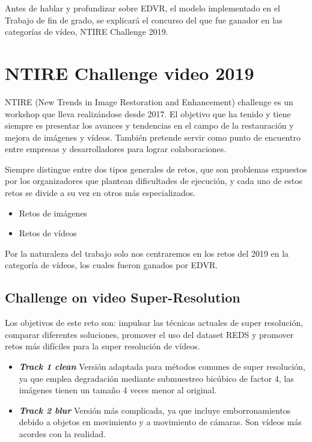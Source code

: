 
    Antes de hablar y profundizar sobre EDVR, el modelo implementado en el Trabajo de fin de grado, se explicará el concurso del que fue ganador en las categorías de vídeo, NTIRE Challenge 2019.
    
    \section{NTIRE Challenge video 2019}

   NTIRE (New Trends in Image Restoration and Enhancement) challenge es un workshop que lleva realizándose desde 2017. El objetivo que ha tenido y tiene siempre es presentar los avances y tendencias en el campo de la restauración y mejora de imágenes y vídeos. También pretende servir como punto de encuentro entre empresas y desarrolladores para lograr colaboraciones. 

    Siempre distingue entre dos tipos generales de retos, que son problemas expuestos por los organizadores que plantean dificultades de ejecución, y cada uno de estos retos se divide a su vez en otros más especializados.
    \begin{itemize}
    \item Retos de imágenes
    \item Retos de vídeos
    \end{itemize}
    
    Por la naturaleza del trabajo solo nos centraremos en los retos del 2019 en la categoría de vídeos, los cuales fueron ganados por EDVR.
    
    \subsection {Challenge on video Super-Resolution ~\cite{Nah_2019_CVPR_Workshops}}
        Los objetivos de este reto son: impulsar las técnicas actuales de super resolución, comparar diferentes soluciones, promover el uso del dataset REDS y promover retos más difíciles para la super resolución de vídeos.
        
        \begin{itemize}
        \item\textbf {\emph{Track 1 clean}} Versión adaptada para métodos comunes de super resolución, ya que emplea degradación mediante submuestreo bicúbico de factor 4, las imágenes tienen un tamaño 4 veces menor al original.
        
        \item\textbf {\emph{Track 2 blur }} Versión más complicada, ya que incluye emborronamientos debido a objetos en movimiento y a movimiento de cámaras.  Son vídeos más acordes con la realidad.
        \end{itemize}
        
